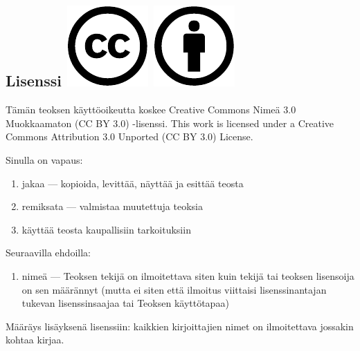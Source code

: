 \subsection*{Lisenssi \includegraphics[scale=0.3]{pictures/cc.pdf} \includegraphics[scale=0.3]{pictures/by.pdf}}

Tämän teoksen käyttöoikeutta koskee Creative Commons Nimeä 3.0 Muokkaamaton (CC BY 3.0) -lisenssi.
This work is licensed under a Creative Commons Attribution 3.0 Unported (CC BY 3.0) License.


Sinulla on vapaus:
\begin{enumerate}
\item jakaa — kopioida, levittää, näyttää ja esittää teosta
\item remiksata — valmistaa muutettuja teoksia
\item käyttää teosta kaupallisiin tarkoituksiin
\end{enumerate}
Seuraavilla ehdoilla:
\begin{enumerate}
\item nimeä — Teoksen tekijä on ilmoitettava siten kuin tekijä tai teoksen lisensoija on sen määrännyt (mutta ei siten että ilmoitus viittaisi lisenssinantajan tukevan lisenssinsaajaa tai Teoksen käyttötapaa)
\end{enumerate}

Määräys lisäyksenä lisenssiin: kaikkien kirjoittajien nimet on ilmoitettava jossakin kohtaa kirjaa.



\newpage
